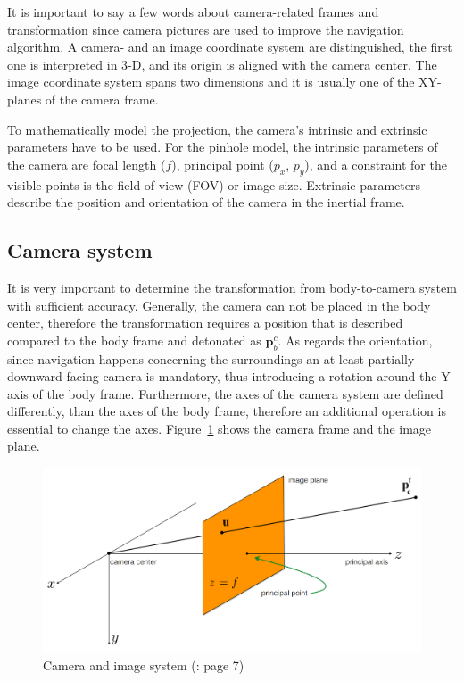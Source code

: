 It is important to say a few words about camera-related frames and transformation since camera pictures are used to improve the navigation algorithm. A camera- and an image coordinate system are distinguished, the first one is interpreted in 3-D, and its origin is aligned with the camera center. The image coordinate system spans two dimensions and it is usually one of the XY-planes of the camera frame. 

To mathematically model the projection, the camera's intrinsic and extrinsic parameters have to be used. For the pinhole model, the intrinsic parameters of the camera are focal length ($f$), principal point ($p_x$, $p_y$), and a constraint for the visible points is the field of view (FOV) or image size. Extrinsic parameters describe the position and orientation of the camera in the inertial frame.

\subsection{Camera system}

It is very important to determine the transformation from body-to-camera system with sufficient accuracy. Generally, the camera can not be placed in the body center, therefore the transformation requires a position that is described compared to the body frame and detonated as $\mathbf{p}_{b}^c$. As regards the orientation, since navigation happens concerning the surroundings an at least partially downward-facing camera is mandatory, thus introducing a rotation around the Y-axis of the body frame. Furthermore, the axes of the camera system are defined differently, than the axes of the body frame, therefore an additional operation is essential to change the axes. Figure~\ref{fig:camera-system} shows the camera frame and the image plane. 

\begin{figure}[!ht]
    \centering
    \includegraphics[width=\textwidth]{figures/camera.png}
    \caption{Camera and image system (\cite{camera-matrix-slide}: page 7)}\label{fig:camera-system}
\end{figure}

